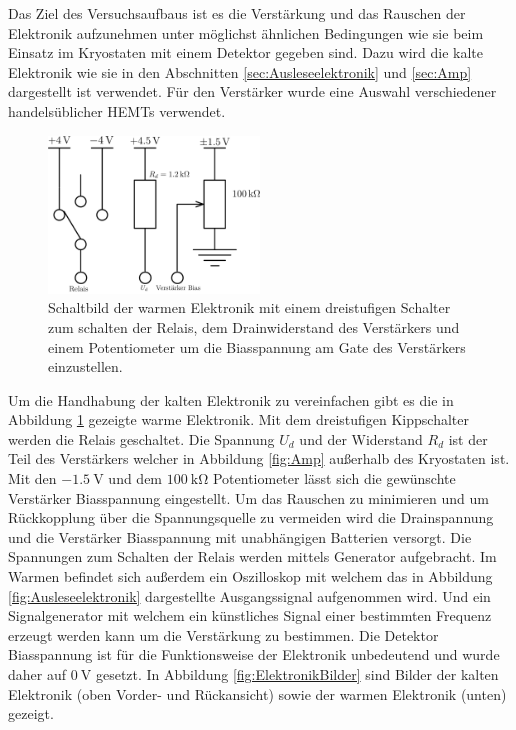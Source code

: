 Das Ziel des Versuchsaufbaus ist es die Verstärkung und das Rauschen der Elektronik aufzunehmen unter möglichst ähnlichen Bedingungen wie sie beim Einsatz im Kryostaten mit einem Detektor gegeben sind.
Dazu wird die kalte Elektronik wie sie in den Abschnitten \ref{sec:Ausleseelektronik} und \ref{sec:Amp} dargestellt ist verwendet.
Für den Verstärker wurde eine Auswahl verschiedener handelsüblicher HEMTs verwendet.

\begin{figure}[!t]
\begin{center}
\includegraphics[width=0.5\textwidth]{./fig/Box.pdf}
\vspace{-0.5cm}
\caption{Schaltbild der warmen Elektronik mit einem dreistufigen Schalter zum schalten der Relais, dem Drainwiderstand des Verstärkers und einem Potentiometer um die Biasspannung am Gate des Verstärkers einzustellen.}
\label{fig:WarmeElektronik}
\end{center}
\end{figure}

Um die Handhabung der kalten Elektronik zu vereinfachen gibt es die in Abbildung \ref{fig:WarmeElektronik} gezeigte warme Elektronik.
Mit dem dreistufigen Kippschalter werden die Relais geschaltet.
Die Spannung $U_d$ und der Widerstand $R_d$ ist der Teil des Verstärkers welcher in Abbildung \ref{fig:Amp} außerhalb des Kryostaten ist.
Mit den $\SI{-1.5}{\volt}$ und dem $\SI{100}{\kilo\ohm}$ Potentiometer lässt sich die gewünschte Verstärker Biasspannung eingestellt.
Um das Rauschen zu minimieren und um Rückkopplung über die Spannungsquelle zu vermeiden wird die Drainspannung und die Verstärker Biasspannung mit unabhängigen Batterien versorgt.
Die Spannungen zum Schalten der Relais werden mittels Generator aufgebracht.
Im Warmen befindet sich außerdem ein Oszilloskop mit welchem das in Abbildung \ref{fig:Ausleseelektronik} dargestellte Ausgangssignal aufgenommen wird.
Und ein Signalgenerator mit welchem ein künstliches Signal einer bestimmten Frequenz erzeugt werden kann um die Verstärkung zu bestimmen.
Die Detektor Biasspannung ist für die Funktionsweise der Elektronik unbedeutend und wurde daher auf $\SI{0}{\volt}$ gesetzt.
In Abbildung \ref{fig:ElektronikBilder} sind Bilder der kalten Elektronik (oben Vorder- und Rückansicht) sowie der warmen Elektronik (unten) gezeigt.

